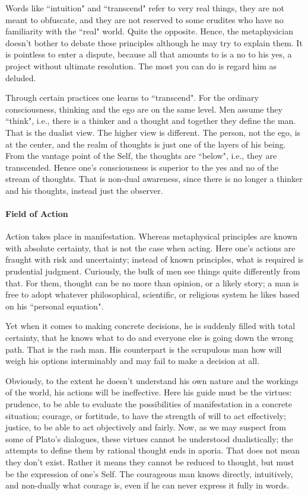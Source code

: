 Words like ``intuition" and ``transcend" refer to very real things, they are not meant to obfuscate, and they are not reserved to some erudites who have no familiarity with the ``real" world. Quite the opposite. Hence, the metaphysician doesn't bother to debate these principles although he may try to explain them. It is pointless to enter a dispute, because all that amounts to is a no to his yes, a project without ultimate resolution. The most you can do is regard him as deluded.

Through certain practices one learns to ``transcend". For the ordinary consciousness, thinking and the ego are on the same level. Men assume they ``think", i.e., there is a thinker and a thought and together they define the man. That is the dualist view. The higher view is different. The person, not the ego, is at the center, and the realm of thoughts is just one of the layers of his being. From the vantage point of the Self, the thoughts are ``below", i.e., they are transcended. Hence one's consciousness is superior to the yes and no of the stream of thoughts. That is non-dual awareness, since there is no longer a thinker and his thoughts, instead just the observer.

\paragraph{Field of Action}
Action takes place in manifestation. Whereas metaphysical principles are known with absolute certainty, that is not the case when acting. Here one's actions are fraught with risk and uncertainty; instead of known principles, what is required is prudential judgment. Curiously, the bulk of men see things quite differently from that. For them, thought can be no more than opinion, or a likely story; a man is free to adopt whatever philosophical, scientific, or religious system he likes based on his ``personal equation".

Yet when it comes to making concrete decisions, he is suddenly filled with total certainty, that he knows what to do and everyone else is going down the wrong path. That is the rash man. His counterpart is the scrupulous man how will weigh his options interminably and may fail to make a decision at all.

Obviously, to the extent he doesn't understand his own nature and the workings of the world, his actions will be ineffective. Here his guide must be the virtues: prudence, to be able to evaluate the possibilities of manifestation in a concrete situation; courage, or fortitude, to have the strength of will to act effectively; justice, to be able to act objectively and fairly. Now, as we may suspect from some of Plato's dialogues, these virtues cannot be understood dualistically; the attempts to define them by rational thought ends in aporia. That does not mean they don't exist. Rather it means they cannot be reduced to thought, but must be the expression of one's Self. The courageous man knows directly, intuitively, and non-dually what courage is, even if he can never express it fully in words.

